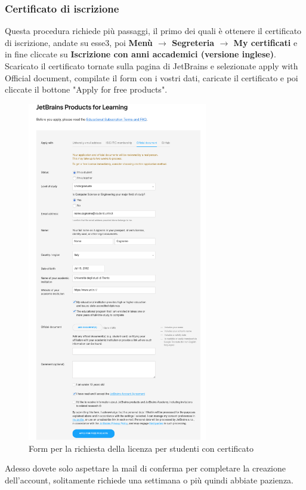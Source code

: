         \subsubsection{Certificato di iscrizione}
            Questa procedura richiede più passaggi, il primo dei quali è ottenere il certificato di iscrizione, andate su esse3, poi \textbf{Menù $\rightarrow$ Segreteria $\rightarrow$ My certificati} e in fine 
            cliccate su \textbf{Iscrizione con anni accademici (versione inglese)}. Scaricato il certificato tornate sulla pagina di JetBrains e selezionate apply with Official document, 
            compilate il form con i vostri dati, caricate il certificato e poi cliccate il bottone "Apply for free products".
            \begin{figure}[H]
                \centering
                \graphicspath{{src/capitoli/04/img/}}
                \includegraphics[width=0.7\textwidth]{form-studente-cert.png}
                \caption{Form per la richiesta della licenza per studenti con certificato}
                \label{fig:Form per la richiesta della licenza per studenti con certificato}
            \end{figure}
            Adesso dovete solo aspettare la mail di conferma per completare la creazione dell'account, solitamente richiede una settimana o più quindi abbiate pazienza.
    
